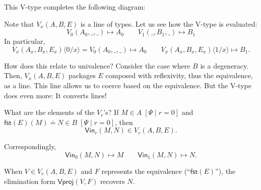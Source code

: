 \documentclass{article} \usepackage{chtt-notes} \usepackage{stmaryrd}
\newcommand{\fst}{\mathsf{fst}}
\begin{document}
This V-type completes the following diagram:
\begin{center}
\end{center}
Note that $V_x(A, B, E)$ is a line of types.
Let us see how the V-type is evaluated:
\[ V_0(A_0, \_, \_) \mapsto A_0 \qquad V_1(\_, B_1, \_) \mapsto B_1 \]
In particular,
\[ V_x(A_x, B_x, E_x)\langle 0 / x \rangle = V_0(A_0, \_, \_) \mapsto A_0 \qquad V_x(A_x, B_x, E_x)\langle 1 / x \rangle \mapsto B_1. \]

How does this relate to univalence? Consider the case where $B$ is a degeneracy.
Then, $V_x(A, B, E)$ packages $E$ composed with reflexivity, thus the equivalence, as a line.
This line allows us to coerce based on the equivalence.
But the V-type does even more: It converts lines!

What are the elements of the $V_r$'s?
If $M \in A\;[\Psi \mid r = 0]$ and $\fst(E)(M) \doteq N \in B \; [\Psi \mid r = 0]$, then
\[ \mathsf{Vin}_r(M, N) \in V_r(A, B, E) .\]
\begin{center}
\end{center}
Correspondingly,
\[ \mathsf{Vin}_0(M, N) \mapsto M \qquad \mathsf{Vin}_1(M, N) \mapsto N.\]

When $V \in V_r(A, B, E)$ and $F$ represents the equivalence (``$\fst(E)$''), the elimination form $\mathsf{Vproj}(V, F)$ recovers $N$.
\end{document}
